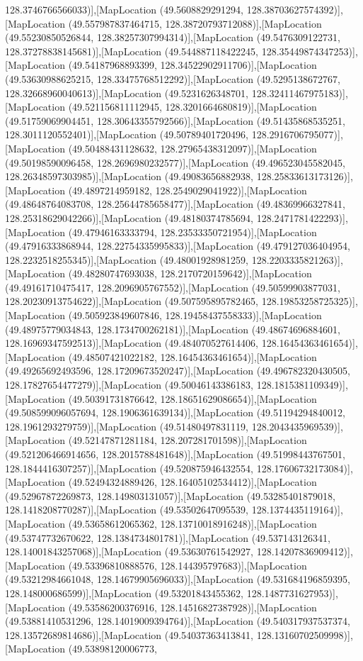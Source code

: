 128.3746766566033)],[MapLocation (49.5608829291294, 128.38703627574392)],[MapLocation (49.557987837464715, 128.38720793712088)],[MapLocation (49.55230850526844, 128.38257307994314)],[MapLocation (49.5476309122731, 128.37278838145681)],[MapLocation (49.544887118422245, 128.35449874347253)],[MapLocation (49.54187968893399, 128.34522902911706)],[MapLocation (49.53630988625215, 128.33475768512292)],[MapLocation (49.5295138672767, 128.32668960040613)],[MapLocation (49.5231626348701, 128.32411467975183)],[MapLocation (49.521156811112945, 128.3201664680819)],[MapLocation (49.51759069904451, 128.30643355792566)],[MapLocation (49.51435868535251, 128.3011120552401)],[MapLocation (49.50789401720496, 128.2916706795077)],[MapLocation (49.50488431128632, 128.27965438312097)],[MapLocation (49.50198590096458, 128.2696980232577)],[MapLocation (49.496523045582045, 128.26348597303985)],[MapLocation (49.49083656882938, 128.25833613173126)],[MapLocation (49.4897214959182, 128.2549029041922)],[MapLocation (49.48648764083708, 128.25644785658477)],[MapLocation (49.48369966327841, 128.25318629042266)],[MapLocation (49.48180374785694, 128.2471781422293)],[MapLocation (49.47946163333794, 128.23533350721954)],[MapLocation (49.47916333868944, 128.22754335995833)],[MapLocation (49.479127036404954, 128.2232518255345)],[MapLocation (49.48001928981259, 128.2203335821263)],[MapLocation (49.48280747693038, 128.2170720159642)],[MapLocation (49.49161710475417, 128.2096905767552)],[MapLocation (49.50599903877031, 128.20230913754622)],[MapLocation (49.507595895782465, 128.19853258725325)],[MapLocation (49.505923849607846, 128.19458437558333)],[MapLocation (49.48975779034843, 128.1734700262181)],[MapLocation (49.48674696884601, 128.16969347592513)],[MapLocation (49.484070527614406, 128.16454363461654)],[MapLocation (49.48507421022182, 128.16454363461654)],[MapLocation (49.49265692493596, 128.17209673520247)],[MapLocation (49.496782320430505, 128.17827654477279)],[MapLocation (49.50046143386183, 128.1815381109349)],[MapLocation (49.50391731876642, 128.18651629086654)],[MapLocation (49.508599096057694, 128.1906361639134)],[MapLocation (49.51194294840012, 128.1961293279759)],[MapLocation (49.51480497831119, 128.2043435969539)],[MapLocation (49.52147871281184, 128.207281701598)],[MapLocation (49.521206466914656, 128.2015788481648)],[MapLocation (49.51998443767501, 128.1844416307257)],[MapLocation (49.520875946432554, 128.17606732173084)],[MapLocation (49.52494324889426, 128.16405102534412)],[MapLocation (49.52967872269873, 128.149803131057)],[MapLocation (49.53285401879018, 128.1418208770287)],[MapLocation (49.53502647095539, 128.1374435119164)],[MapLocation (49.53658612065362, 128.13710018916248)],[MapLocation (49.53747732670622, 128.1384734801781)],[MapLocation (49.537143126341, 128.14001843257068)],[MapLocation (49.53630761542927, 128.14207836909412)],[MapLocation (49.53396810888576, 128.144395797683)],[MapLocation (49.53212984661048, 128.14679905696033)],[MapLocation (49.531684196859395, 128.148000686599)],[MapLocation (49.53201843455362, 128.1487731627953)],[MapLocation (49.53586200376916, 128.14516827387928)],[MapLocation (49.53881410531296, 128.14019009394764)],[MapLocation (49.540317937537374, 128.13572689814686)],[MapLocation (49.54037363413841, 128.13160702509998)],[MapLocation (49.53898120006773, 